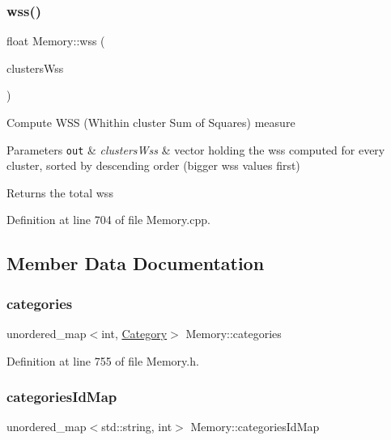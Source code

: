 \subsubsection{\texorpdfstring{wss()}{wss()}}
{\footnotesize\ttfamily float Memory\+::wss (\begin{DoxyParamCaption}\item[{std\+::vector$<$ std\+::pair$<$ int, \hyperlink{class_wss_bag}{Wss\+Bag} $>$ $>$ \&}]{clusters\+Wss }\end{DoxyParamCaption})}

Compute W\+SS (Whithin cluster Sum of Squares) measure


\begin{DoxyParams}[1]{Parameters}
\mbox{\tt out}  & {\em clusters\+Wss} & vector holding the wss computed for every cluster, sorted by descending order (bigger wss values first)\\
\hline
\end{DoxyParams}
Returns the total wss 

Definition at line 704 of file Memory.\+cpp.



\subsection{Member Data Documentation}
\mbox{\label{class_memory_ab7733936ac814bc1f834a79fd868c8d9}} 
\subsubsection{\texorpdfstring{categories}{categories}}
{\footnotesize\ttfamily unordered\+\_\+map$<$int, \hyperlink{class_category}{Category}$>$ Memory\+::categories\hspace{0.3cm}{\ttfamily [protected]}}



Definition at line 755 of file Memory.\+h.

\mbox{\label{class_memory_aa40e026a0318c101754d065725a7b72d}} 
\subsubsection{\texorpdfstring{categories\+Id\+Map}{categoriesIdMap}}
{\footnotesize\ttfamily unordered\+\_\+map$<$std\+::string, int$>$ Memory\+::categories\+Id\+Map\hspace{0.3cm}{\ttfamily [protected]}}

